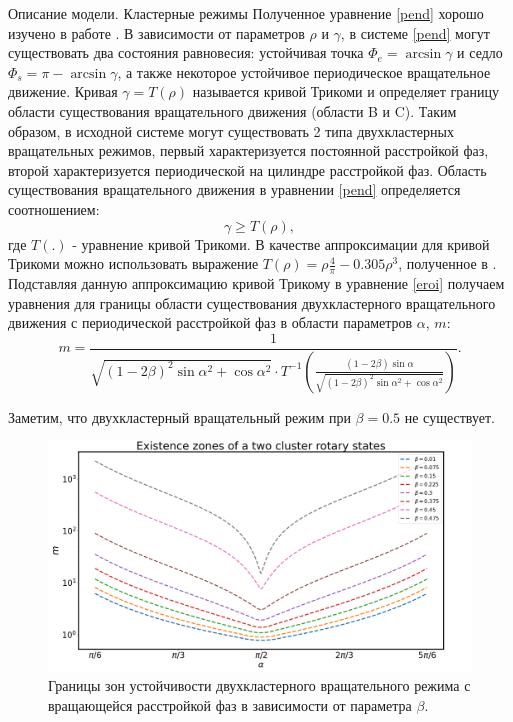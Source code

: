 \begin{chapter}{Описание модели. Кластерные режимы}
	Полученное уравнение \eqref{pend} хорошо изучено в работе \cite{Andronov:Vitt}.
	В зависимости от параметров $\rho$ и $\gamma$, в системе \eqref{pend}
	могут существовать два состояния равновесия:
	устойчивая точка $\Phi_e = \arcsin{\gamma}$ и седло
	$\Phi_s = \pi - \arcsin{\gamma}$, а также
	некоторое устойчивое периодическое вращательное движение.
	Кривая $\gamma=T(\rho)$ называется кривой Трикоми и определяет границу области существования вращательного движения (области B и C).
	Таким образом, в исходной системе могут существовать 2 типа
	двухкластерных вращательных режимов, первый характеризуется
	постоянной расстройкой фаз, второй характеризуется
    периодической на цилиндре расстройкой фаз.
	Область существования вращательного движения в уравнении \eqref{pend}
	определяется соотношением:
	\begin{equation}
		\gamma \ge T(\rho),
		\label{eroi}
	\end{equation}
	где $T(.)$ - уравнение кривой Трикоми. В качестве аппроксимации для кривой Трикоми можно использовать выражение
	$T(\rho) = \rho\frac{4}{\pi} - 0.305\rho^3$, полученное в \cite{Belykh:Brister}.
	Подставляя данную аппроксимацию кривой Трикому в уравнение \eqref{eroi} получаем уравнения для границы области существования двухкластерного вращательного движения с
	периодической расстройкой фаз в области параметров $\alpha$, $m$:
	\begin{equation} \label{borders}
		m = \frac{1}{\sqrt{(1 - 2\beta)^2\sin{\alpha}^2 + \cos{\alpha}^2} \cdot T^{-1}(\frac{(1 - 2\beta)\sin{\alpha}}{\sqrt{(1 - 2\beta)^2\sin{\alpha}^2 + \cos{\alpha}^2}})}.
	\end{equation}

	Заметим, что двухкластерный вращательный режим при $\beta = 0.5$ не существует.

	\begin{figure}[h!]
		\begin{center}
			\includegraphics[width=1\columnwidth]{pictures/ex.png}
		\end{center}
		\caption{Границы зон устойчивости двухкластерного вращательного режима с вращающейся расстройкой фаз в зависимости от параметра $\beta$.}
		\label{ex-zones}
	\end{figure}


\end{chapter}
